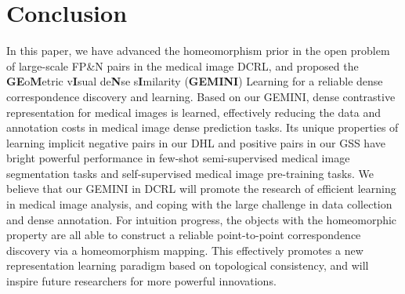 \section{Conclusion}
\label{sec:conclusion}
In this paper, we have advanced the homeomorphism prior in the open problem of large-scale FP\&N pairs in the medical image DCRL, and proposed the \textbf{GE}o\textbf{M}etric v\textbf{I}sual de\textbf{N}se s\textbf{I}milarity (\textbf{GEMINI}) Learning for a reliable dense correspondence discovery and learning. Based on our GEMINI, dense contrastive representation for medical images is learned, effectively reducing the data and annotation costs in medical image dense prediction tasks. Its unique properties of learning implicit negative pairs in our DHL and positive pairs in our GSS have bright powerful performance in few-shot semi-supervised medical image segmentation tasks and self-supervised medical image pre-training tasks. We believe that our GEMINI in DCRL will promote the research of efficient learning in medical image analysis, and coping with the large challenge in data collection and dense annotation. For intuition progress, the objects with the homeomorphic property are all able to construct a reliable point-to-point correspondence discovery via a homeomorphism mapping. This effectively promotes a new representation learning paradigm based on topological consistency, and will inspire future researchers for more powerful innovations.

